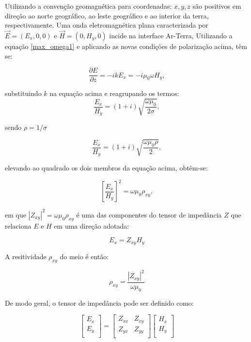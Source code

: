 Utilizando a convenção geomagnética para coordenadas: $x, y, z$ são positivos em direção ao norte geográfico, ao leste geográfico e ao interior da terra, respectivamente. Uma onda eletromagnética plana caracterizada por $\vec{E}=(E_{x},0,0)$ e $\vec{H}=(0,H_{y},0)$ incide na interface Ar-Terra, Utilizando a equação \eqref{max_omega1} e aplicando as novas condições de polarização acima, têm se:

\begin{equation}
\frac{\partial E}{\partial z} = -ikE_{x}= -i\mu_{0} \omega H_{y},
\label{m1}
\end{equation}

substituindo $k$ na equação acima e reagrupando os termos:
\begin{equation}
\frac{E_{x}}{H_{y}}= (1+i)\sqrt{\frac{\omega\mu_{0}}{2\sigma}},
\label{m2}
\end{equation}

sendo $\rho=1/\sigma$

\begin{equation}
\frac{E_{x}}{H_{y}}= (1+i)\sqrt{\frac{\omega\mu_{0}\rho}{2}},
\label{m3}
\end{equation}

elevando ao quadrado os dois membros da equação acima, obtêm-se:

\begin{equation}
\left[\frac{E_{x}}{H_{y}}\right]^2 =\omega\mu_{0}\rho_{xy},
\label{m4}
\end{equation}

em que $|Z_{xy}|^{2}=\omega\mu_{0}\rho_{xy}$ é uma das componentes do tensor de impedância $Z$ que relaciona $E$ e $H$ em uma direção adotada:

\begin{equation}
E_{x}=Z_{xy}H_{y}
\label{m5}
\end{equation}

A resitividade $\rho_{xy}$ do meio é então:

\begin{equation}
\rho_{xy}= \frac{|Z_{xy}|^{2}}{\omega\mu_{0}}
\label{m6}
\end{equation}

De modo geral, o tensor de impedância pode ser definido como:

	\begin{equation}
	\left[\begin{array}{c}
	E_{x} \\
	E_{y} \\
	\end{array}\right] =
	\left[\begin{array}{cc}
	Z_{xx} &  Z_{xy} \\
	Z_{yx} &  Z_{yy} \\
	\end{array}\right]	\left[\begin{array}{c}
	H_{x} \\
	H_{y} \\
	\end{array}\right]
	\end{equation}
